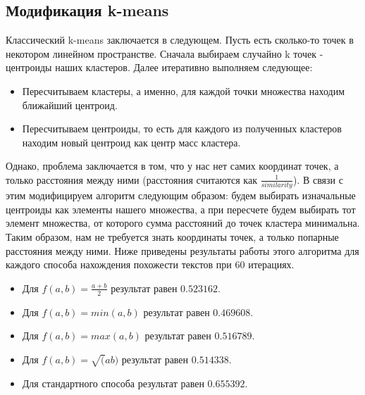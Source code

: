 \subsection{Модификация k-means}
Классический k-means заключается в следующем. Пусть есть сколько-то точек в некотором линейном пространстве. Сначала выбираем случайно k точек - центроиды наших кластеров. Далее итеративно выполняем следующее:
\begin{itemize}
\item Пересчитываем кластеры, а именно, для каждой точки множества находим ближайший центроид.
\item Пересчитываем центроиды, то есть для каждого из полученных кластеров находим новый центроид как центр масс кластера.
\end{itemize}
Однако, проблема заключается в том, что у нас нет самих координат точек, а только расстояния между ними (расстояния считаются как $\frac{1}{similarity}$). В связи с этим модифицируем алгоритм следующим образом: будем выбирать изначальные центроиды как элементы нашего множества, а при пересчете будем выбирать тот элемент множества, от которого сумма расстояний до точек кластера минимальна. Таким образом, нам не требуется знать координаты точек, а только попарные расстояния между ними. \newline
Ниже приведены результаты работы этого алгоритма для каждого способа нахождения похожести текстов при 60 итерациях.
\begin{itemize}
\item Для $f(a, b) = \frac{a + b}{2}$ результат равен $0.523162$.
\item Для $f(a, b) = min(a, b)$ результат равен $0.469608$.
\item Для $f(a, b) = max(a, b)$ результат равен $0.516789$.
\item Для $f(a, b) = \sqrt(ab)$ результат равен $0.514338$.
\item Для стандартного способа результат равен $0.655392$.
\end{itemize}

